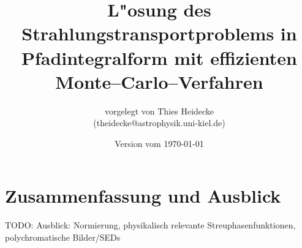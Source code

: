 \documentclass[
	12pt,
	a4paper,
	DIVcalc,
	titlepage,
	twoside,
	liststotoc,
	bibtotocnumbered
]{scrbook}
\begin{document}
\frontmatter
	\titlehead{Christian--Albrechts--Universit"at zu Kiel\\ Institut f"ur Theoretische Physik und Astrophysik}
	\subject{Diplomarbeit}
	\title{L"osung des Strahlungstransportproblems in Pfadintegralform mit effizienten Monte--Carlo--Verfahren}
	\author{vorgelegt von Thies Heidecke\\(theidecke@astrophysik.uni-kiel.de)}
	\publishers{betreut durch Prof. Dr. Sebastian Wolf}
	\date{Version vom \today}
	\maketitle

	\tableofcontents	%

	\newcommand{\location}[1]{\mathbf{#1}}
	\newcommand{\scatter}[1]{\overset{#1}{\leftrightsquigarrow}}
	\newcommand{\normalized}[1]{\frac{#1}{||#1||}}

\mainmatter
	
	
	
	
	
	
		
	
	\chapter{Zusammenfassung und Ausblick}
	TODO: Ausblick: Normierung, physikalisch relevante Streuphasenfunktionen, polychromatische Bilder/SEDs

\backmatter
	
	
\end{document}
